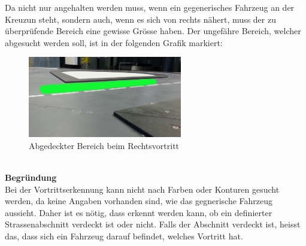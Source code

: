 \newpage
Da nicht nur angehalten werden muss, wenn ein gegenerisches Fahrzeug an der Kreuzun steht, sondern auch, wenn es sich von rechts nähert, muss der zu überprüfende Bereich eine gewisse Grösse haben. Der ungefähre Bereich, welcher abgesucht werden soll, ist in der folgenden Grafik markiert:
\begin{figure}[H]%
\centering
\includegraphics[width=0.6\textwidth]{03_Loesungskonzept/pictures/rechtsvortritt_bereich.jpg}
\caption{Abgedeckter Bereich beim Rechtsvortritt}
\label{fig:bereichRechtsvortritt}
\end{figure}
\\
\textbf{Begründung}\\[0.2cm]
Bei der Vortrittserkennung kann nicht nach Farben oder Konturen gesucht werden, da keine Angaben vorhanden sind, wie das gegnerische Fahrzeug aussieht. Daher ist es nötig, dass erkennt werden kann, ob ein definierter Strassenabschnitt verdeckt ist oder nicht. Falls der Abschnitt verdeckt ist, heisst das, dass sich ein Fahrzeug darauf befindet, welches Vortritt hat.
